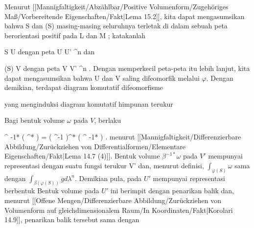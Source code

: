{

Menurut
[[Mannigfaltigkeit/Abzählbar/Positive Volumenform/Zugehöriges Maß/Vorbereitende Eigenschaften/Fakt|Lema 15.2]],
kita dapat mengasumsikan bahwa
\mathkor {} {S} {dan} {\varphi(S)} {}
masing-masing seluruhnya terletak di dalam sebuah peta berorientasi positif pada
\mathkor {} {L} {dan} {M} {;}
katakanlah

\mavergleichskette
{\vergleichskette
{ S
}
{ \subseteq }{ U
}
{  }{
}
{    }{
}
{   }{
}
}
{}{}{}
dengan peta
\maabbdisp {\alpha} { U } { U' \subseteq \R^n
} {}
dan

\mavergleichskette
{\vergleichskette
{ \varphi(S)
}
{ \subseteq }{ V
}
{  }{
}
{    }{
}
{   }{
}
}
{}{}{}
dengan peta
\maabbdisp {\beta} { V } { V' \subseteq \R^n
} {.}
Dengan memperkecil peta-peta itu lebih lanjut, kita dapat mengasumsikan bahwa
\mathkor {} {U} {dan} {V} {}
saling difeomorfik melalui $\varphi$. Dengan demikian, terdapat diagram komutatif difeomorfisme

 {  }

yang menginduksi diagram komutatif himpunan terukur

 {  }

Bagi bentuk volume $\omega$ pada $V$, berlaku

\mavergleichskettedisp
{\vergleichskette
{ \alpha^{ {-1}*} ( \varphi^* \omega)
}
{ =} { \left(  \beta \circ \varphi \circ \alpha^{-1}  \right)^*  ( \beta^{ {-1}*} \omega)
}
{ } {
}
{ } {
}
{ } {
}
}
{}{}{.}
menurut
[[Mannigfaltigkeit/Differenzierbare Abbildung/Zurückziehen von Differentialformen/Elementare Eigenschaften/Fakt|Lema 14.7 (4)]].
Bentuk volume $\beta^{ {-1}*} \omega$ pada $V'$ mempunyai representasi
 dengan suatu fungsi terukur
 {V'} {\R
} {}
dan, menurut definisi, $\int_{\varphi(S)} \omega$ sama dengan $\int_{\beta( \varphi(S))} g d \lambda^n$. Demikian pula,
 pada $U'$ mempunyai representasi berbentuk
 Bentuk volume pada $U'$ ini berimpit dengan penarikan balik
 dan, menurut
[[Offene Mengen/Differenzierbare Abbildung/Zurückziehen von Volumenform auf gleichdimensionalem Raum/In Koordinaten/Fakt|Korolari 14.9]],
penarikan balik tersebut sama dengan

}
